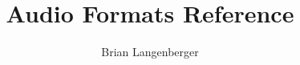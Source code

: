 \documentclass[letterpaper]{scrbook}
\title{Audio Formats Reference}
\author{Brian Langenberger}
\begin{document}
\maketitle
\tableofcontents



















\begin{appendices}

\end{appendices}
\end{document}
